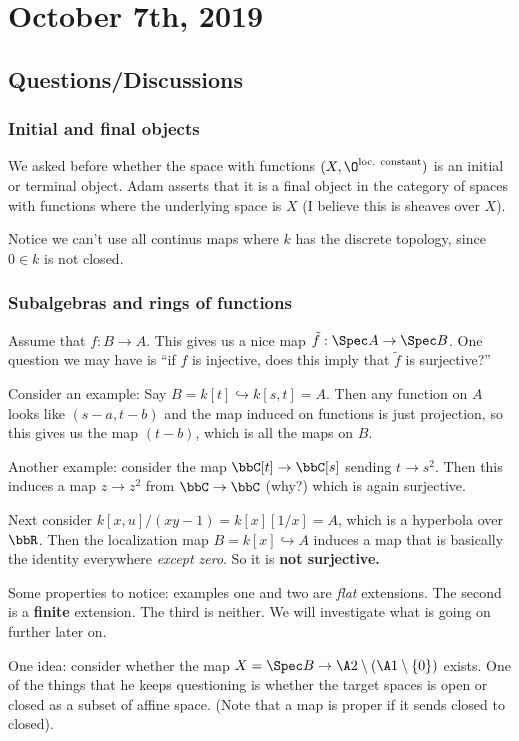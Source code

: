 \documentclass[12pt]{article}
\begin{document}
\section{October 7th, 2019}
\subsection{Questions/Discussions}
\subsubsection{Initial and final objects}
We asked before whether the space with functions $(X,\O^{\text{loc. constant}})$ is an initial or terminal 
object. Adam asserts that it is a final object in the category of spaces with functions where the underlying space is $X$ (I believe this 
is sheaves over $X$). 

Notice we can't use all continus maps where $k$ has the discrete topology, since $0\in k$ is not closed. 

\subsubsection{Subalgebras and rings of functions}
Assume that $f:B\to A$. This gives us a nice map $\tilde f:\Spec A\to \Spec B$. One question we may have is 
``if $f$ is injective, does this imply that $\tilde f$ is surjective?''

Consider an example: Say $B=k[t]\hookrightarrow k[s,t]=A$. Then any function on $A$ looks like $(s-a,t-b)$
and the map induced on functions is just projection, so this gives us the map $(t-b)$, which is all the maps on $B$.

Another example: consider the map $\bbC[t]\to\bbC[s]$ sending $t\to s^2$. Then this induces a map $z\to z^2$ from $\bbC\to \bbC$ (why?)
which is again surjective.

Next consider $k[x,u]/(xy-1)=k[x][1/x]=A$, which is a hyperbola over $\bbR$. Then the localization map $B=k[x]\hookrightarrow A$
induces a map that is basically the identity everywhere \textit{except zero}. So it is \textbf{not surjective.}

\brk

Some properties to notice: examples one and two are \textit{flat} extensions. The second is a \textbf{finite} extension. The 
third is neither. We will investigate what is going on further later on.

One idea: consider whether the map $X=\Spec B\to \A 2\setminus(\A1\setminus\{0\})$ exists. One of the things that he keeps questioning is 
whether the target spaces is open or closed as a subset of affine space. (Note that a map is proper if it sends closed to closed).
\end{document}
